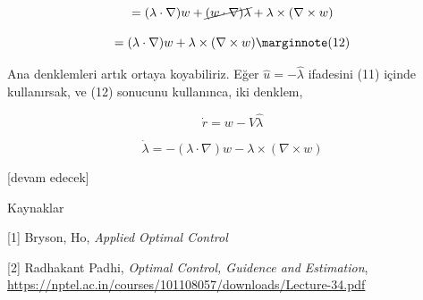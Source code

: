 \documentclass[12pt,fleqn]{article}\usepackage{../../common}
\begin{document}
$$
= (\lambda \cdot \nabla) w + 
\cancel{(w \cdot \nabla) \lambda} +
\lambda \times (\nabla \times w) 
$$

$$
= (\lambda \cdot \nabla) w + \lambda \times (\nabla \times w) 
\mlabel{12}
$$

Ana denklemleri artık ortaya koyabiliriz. Eğer $\hat{u} = -\hat{\lambda}$
ifadesini (11) içinde kullanırsak, ve (12) sonucunu kullanınca, iki
denklem,

$$
\dot{r} = w - V\hat{\lambda}
$$

$$
\dot{\lambda} = -(\lambda \cdot \nabla) w - \lambda \times (\nabla \times w) 
$$


[devam edecek]

Kaynaklar

[1] Bryson, Ho, {\em Applied Optimal Control}

[2] Radhakant Padhi, {\em Optimal Control, Guidence and Estimation}, 
    \url{https://nptel.ac.in/courses/101108057/downloads/Lecture-34.pdf}
\end{document}
